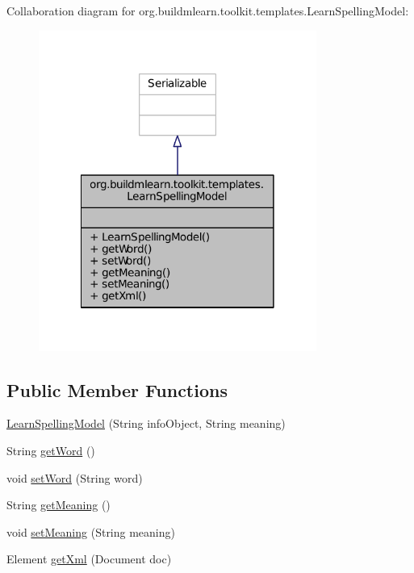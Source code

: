Collaboration diagram for org.\-buildmlearn.\-toolkit.\-templates.\-Learn\-Spelling\-Model\-:
\nopagebreak
\begin{figure}[H]
\begin{center}
\leavevmode
\includegraphics[width=258pt]{de/d04/classorg_1_1buildmlearn_1_1toolkit_1_1templates_1_1LearnSpellingModel__coll__graph}
\end{center}
\end{figure}
\subsection*{Public Member Functions}
\begin{DoxyCompactItemize}
\item 
\hyperlink{classorg_1_1buildmlearn_1_1toolkit_1_1templates_1_1LearnSpellingModel_a3a4f0e6afa5518b6eee58e848921158c}{Learn\-Spelling\-Model} (String info\-Object, String meaning)
\item 
String \hyperlink{classorg_1_1buildmlearn_1_1toolkit_1_1templates_1_1LearnSpellingModel_a076fc8889dd81620c579511cf84cd526}{get\-Word} ()
\item 
void \hyperlink{classorg_1_1buildmlearn_1_1toolkit_1_1templates_1_1LearnSpellingModel_a19e23525a8849fc802aa12ab90f511a2}{set\-Word} (String word)
\item 
String \hyperlink{classorg_1_1buildmlearn_1_1toolkit_1_1templates_1_1LearnSpellingModel_a74785e99070999af859d2211d465d0a2}{get\-Meaning} ()
\item 
void \hyperlink{classorg_1_1buildmlearn_1_1toolkit_1_1templates_1_1LearnSpellingModel_a8e34f3d996440542557e0352429906f2}{set\-Meaning} (String meaning)
\item 
Element \hyperlink{classorg_1_1buildmlearn_1_1toolkit_1_1templates_1_1LearnSpellingModel_a17c942dd683427e078dae596fbf9972a}{get\-Xml} (Document doc)
\end{DoxyCompactItemize}


